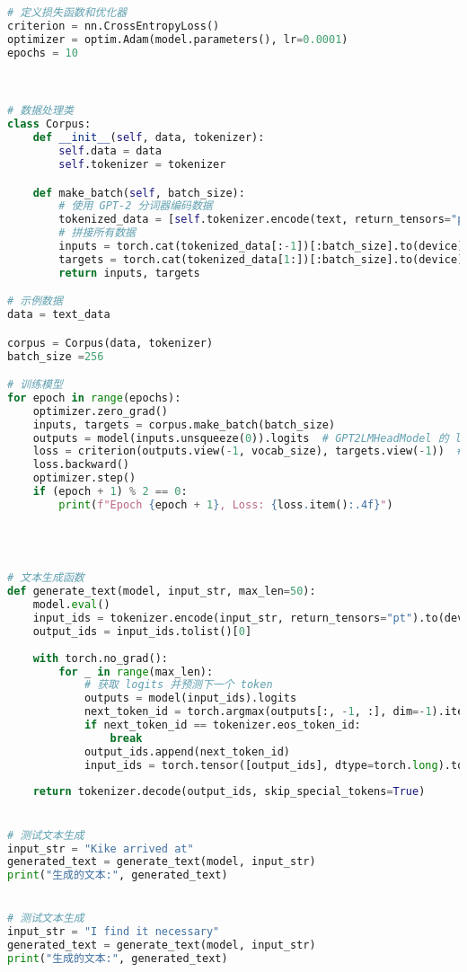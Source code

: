 \documentclass{article}
\begin{document}
\begin{lstlisting}[language=Python]
# 定义损失函数和优化器
criterion = nn.CrossEntropyLoss()
optimizer = optim.Adam(model.parameters(), lr=0.0001)
epochs = 10



# 数据处理类
class Corpus:
    def __init__(self, data, tokenizer):
        self.data = data
        self.tokenizer = tokenizer

    def make_batch(self, batch_size):
        # 使用 GPT-2 分词器编码数据
        tokenized_data = [self.tokenizer.encode(text, return_tensors="pt").squeeze(0) for text in self.data]
        # 拼接所有数据
        inputs = torch.cat(tokenized_data[:-1])[:batch_size].to(device)
        targets = torch.cat(tokenized_data[1:])[:batch_size].to(device)
        return inputs, targets

# 示例数据
data = text_data

corpus = Corpus(data, tokenizer)
batch_size =256

# 训练模型
for epoch in range(epochs):
    optimizer.zero_grad()
    inputs, targets = corpus.make_batch(batch_size)
    outputs = model(inputs.unsqueeze(0)).logits  # GPT2LMHeadModel 的 logits
    loss = criterion(outputs.view(-1, vocab_size), targets.view(-1))  # 计算损失
    loss.backward()
    optimizer.step()
    if (epoch + 1) % 2 == 0:
        print(f"Epoch {epoch + 1}, Loss: {loss.item():.4f}")




# 文本生成函数
def generate_text(model, input_str, max_len=50):
    model.eval()
    input_ids = tokenizer.encode(input_str, return_tensors="pt").to(device)
    output_ids = input_ids.tolist()[0]
    
    with torch.no_grad():
        for _ in range(max_len):
            # 获取 logits 并预测下一个 token
            outputs = model(input_ids).logits
            next_token_id = torch.argmax(outputs[:, -1, :], dim=-1).item()
            if next_token_id == tokenizer.eos_token_id:
                break
            output_ids.append(next_token_id)
            input_ids = torch.tensor([output_ids], dtype=torch.long).to(device)
    
    return tokenizer.decode(output_ids, skip_special_tokens=True)


# 测试文本生成
input_str = "Kike arrived at"
generated_text = generate_text(model, input_str)
print("生成的文本:", generated_text)


# 测试文本生成
input_str = "I find it necessary"
generated_text = generate_text(model, input_str)
print("生成的文本:", generated_text)



\end{lstlisting}
\end{document}
